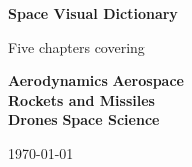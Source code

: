 \documentclass[12pt,a4paper,twoside]{book}
\title{\Huge \booktitle}
\author{}
\date{}
\newcommand{\booktitle}{Space Visual Dictionary}
\begin{document}
\frontmatter
\begin{titlepage}
\centering
\vspace*{3cm}
{\Huge\bfseries \booktitle\par}
\vspace{1cm}
{\Large Five chapters covering\par}
\vspace{0.5cm}
{\large
\textcolor{catAD}{\textbf{Aerodynamics}} \quad
\textcolor{catAE}{\textbf{Aerospace}} \\
\textcolor{catRM}{\textbf{Rockets and Missiles}} \\
\textcolor{catD}{\textbf{Drones}} \quad
\textcolor{catSS}{\textbf{Space Science}}
\par}
\vfill
{\large\today\par}
\end{titlepage}

\tableofcontents
\clearpage
\mainmatter

\clearpage
\end{document}
